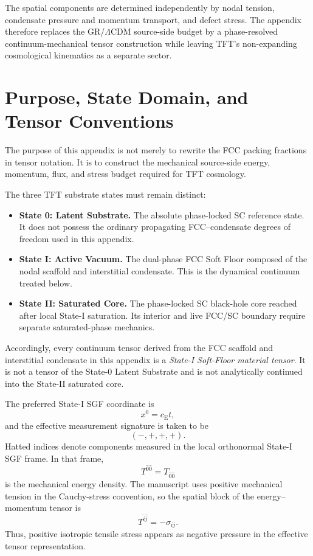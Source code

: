 The spatial components are determined independently by nodal tension, condensate pressure and momentum transport, and defect stress. The appendix therefore replaces the GR/$\Lambda$CDM source-side budget by a phase-resolved continuum-mechanical tensor construction while leaving TFT's non-expanding cosmological kinematics as a separate sector.

\section{Purpose, State Domain, and Tensor Conventions}

The purpose of this appendix is not merely to rewrite the FCC packing fractions in tensor notation. It is to construct the mechanical source-side energy, momentum, flux, and stress budget required for TFT cosmology.

The three TFT substrate states must remain distinct:
\begin{itemize}
    \item \textbf{State 0: Latent Substrate.} The absolute phase-locked SC reference state. It does not possess the ordinary propagating FCC--condensate degrees of freedom used in this appendix.
    \item \textbf{State I: Active Vacuum.} The dual-phase FCC Soft Floor composed of the nodal scaffold and interstitial condensate. This is the dynamical continuum treated below.
    \item \textbf{State II: Saturated Core.} The phase-locked SC black-hole core reached after local State-I saturation. Its interior and live FCC/SC boundary require separate saturated-phase mechanics.
\end{itemize}

Accordingly, every continuum tensor derived from the FCC scaffold and interstitial condensate in this appendix is a \emph{State-I Soft-Floor material tensor}. It is not a tensor of the State-0 Latent Substrate and is not analytically continued into the State-II saturated core.

The preferred State-I SGF coordinate is
\begin{equation}
    x^0 = c_{\mathrm{E}}t,
\end{equation}
and the effective measurement signature is taken to be
\begin{equation}
    (-,+,+,+).
\end{equation}
Hatted indices denote components measured in the local orthonormal State-I SGF frame. In that frame,
\begin{equation}
    T^{\hat{0}\hat{0}} = T_{\hat{0}\hat{0}}
\end{equation}
is the mechanical energy density. The manuscript uses positive mechanical tension in the Cauchy-stress convention, so the spatial block of the energy--momentum tensor is
\begin{equation}
    T^{\hat{i}\hat{j}} = -\sigma_{ij}.
\end{equation}
Thus, positive isotropic tensile stress appears as negative pressure in the effective tensor representation.

